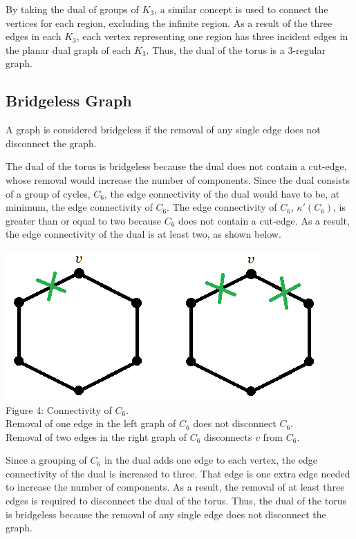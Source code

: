 \documentclass[12pt]{article}
\begin{document}
\begin{flushleft}
\medskip
By taking the dual of groups of $K_3$, a similar concept is used to connect the vertices for each region, excluding the infinite region. As a result of the three edges in each $K_3$, each vertex representing one region has three incident edges in the planar dual graph of each $K_3$. Thus, the dual of the torus is a 3-regular graph.

\subsection*{Bridgeless Graph}
A graph is considered bridgeless if the removal of any single edge does not disconnect the graph.

\medskip
The dual of the torus is bridgeless because the dual does not contain a cut-edge, whose removal would increase the number of components. Since the dual consists of a group of cycles, $C_6$, the edge connectivity of the dual would have to be, at minimum, the edge connectivity of $C_6$. The edge connectivity of $C_6$, $\kappa'(C_6)$, is greater than or equal to two because $C_6$ does not contain a cut-edge. As a result, the edge connectivity of the dual is at least two, as shown below.

\begin{center}
\includegraphics[scale=1]{images/c6connectivity.png}\\
Figure 4: Connectivity of $C_6$.\\
Removal of one edge in the left graph of $C_6$ does not disconnect $C_6$.\\
Removal of two edges in the right graph of $C_6$ disconnects $v$ from $C_6$.
\end{center}

\medskip
Since a grouping of $C_6$ in the dual adds one edge to each vertex, the edge connectivity of the dual is increased to three. That edge is one extra edge needed to increase the number of components. As a result, the removal of at least three edges is required to disconnect the dual of the torus. Thus, the dual of the torus is bridgeless because the removal of any single edge does not disconnect the graph.

\end{flushleft}
\end{document}
